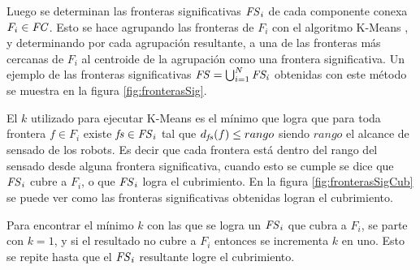 Luego se determinan las fronteras significativas $\mathit{FS}_i$ de cada
componente conexa $F_i\in \mathit{FC}$. Esto se hace agrupando las fronteras de
$F_i$ con el algoritmo K-Means \cite{macqueen1967some}, y determinando por cada
agrupación resultante, a una de las fronteras más cercanas de $F_i$ al
centroide de la agrupación como una frontera significativa. Un ejemplo de
las fronteras significativas $\mathit{FS} = \bigcup_{i=1}^N \mathit{FS_i}$ obtenidas
con este método se muestra en la figura \ref{fig:fronterasSig}.

El $k$ utilizado para ejecutar K-Means es el mínimo que logra que para toda
frontera $f\in F_i$ existe $\mathit{fs} \in \mathit{FS}_i$ tal que $d_{\mathit{fs}}(f) \leq
rango$ siendo $rango$ el alcance de sensado de los robots. Es decir que %
cada frontera está dentro del rango del sensado desde alguna frontera
significativa, cuando esto se cumple se dice que $\mathit{FS}_i$ cubre a $F_i$, o
que $\mathit{FS}_i$ logra el cubrimiento. En la figura \ref{fig:fronterasSigCub} se
puede ver como las fronteras significativas obtenidas logran el cubrimiento.


Para encontrar el mínimo $k$ con las que se logra un $\mathit{FS}_i$ que cubra a
$F_i$, se parte con $k=1$, y si el resultado no cubre a $F_i$ entonces se
incrementa $k$ en uno. Esto se repite hasta que el $\mathit{FS}_i$ resultante
logre el cubrimiento.


